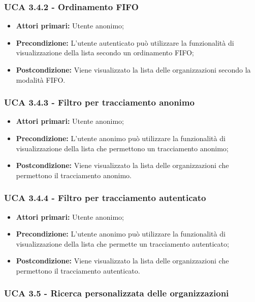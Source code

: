 \subsubsection{UCA 3.4.2 - Ordinamento FIFO}%
\begin{itemize}	
	\item \textbf{Attori primari:} Utente anonimo;
	\item \textbf{Precondizione:} L'utente autenticato può utilizzare la funzionalità di visualizzazione della lista secondo un ordinamento FIFO;
	\item \textbf{Postcondizione:} Viene visualizzato la lista delle organizzazioni secondo la modalità FIFO.
\end{itemize}

\subsubsection{UCA 3.4.3 - Filtro per tracciamento anonimo}%
\begin{itemize}
	\item \textbf{Attori primari:} Utente anonimo;
	\item \textbf{Precondizione:} L'utente anonimo può utilizzare la funzionalità di visualizzazione della lista che permettono un tracciamento anonimo;
	\item \textbf{Postcondizione:} Viene visualizzato la lista delle organizzazioni che permettono il tracciamento anonimo.
\end{itemize}

\subsubsection{UCA 3.4.4 - Filtro per tracciamento autenticato}%
\begin{itemize}
	\item \textbf{Attori primari:} Utente anonimo;
	\item \textbf{Precondizione:} L'utente anonimo può utilizzare la funzionalità di visualizzazione della lista che permette un tracciamento autenticato;
	\item \textbf{Postcondizione:} Viene visualizzato la lista delle organizzazioni che permettono il tracciamento autenticato.
\end{itemize}

\newpage

\subsubsection{UCA 3.5 - Ricerca personalizzata delle organizzazioni}%

